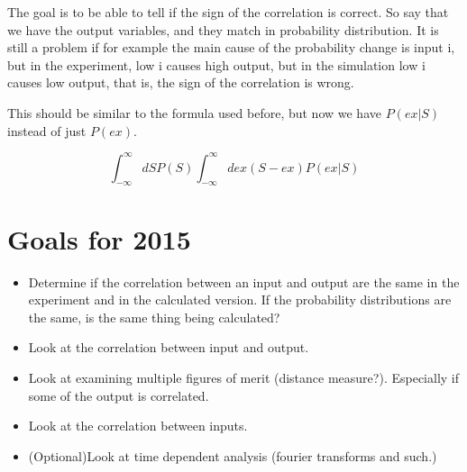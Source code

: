 \documentclass{article}
\begin{document}

The goal is to be able to tell if the sign of the correlation is
correct.  So say that we have the output variables, and they match in
probability distribution.  It is still a problem if for example the
main cause of the probability change is input i, but in the
experiment, low i causes high output, but in the simulation low i
causes low output, that is, the sign of the correlation is wrong.

This should be similar to the formula used before, but now we have
$P(ex | S)$ instead of just $P(ex)$.

\begin{equation}
  \int_{-\infty}^{\infty}dSP(S) \int_{-\infty}^{\infty} dex(S-ex) P(ex | S)
\end{equation}

\section{Goals for 2015}

\begin{itemize}
\item Determine if the correlation between an input and output are the same in the experiment and in the calculated version. If the probability distributions are the same, is the same thing being calculated?
\item Look at the correlation between input and output.
\item Look at examining multiple figures of merit (distance measure?).  Especially if some of the output is correlated.
\item Look at the correlation between inputs.
\item (Optional)Look at time dependent analysis (fourier transforms and such.)
\end{itemize}
\end{document}
